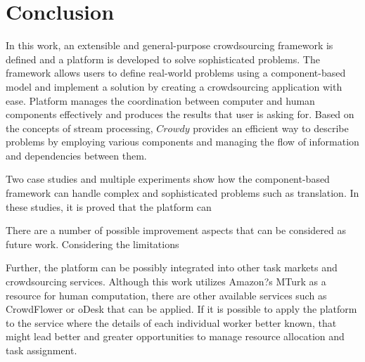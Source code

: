 \chapter{Conclusion}
\label{chap:conclusion}

In this work, an extensible and general-purpose crowdsourcing framework is defined and a platform is developed to solve sophisticated problems. The framework allows users to define real-world problems using a component-based model and implement a solution by creating a crowdsourcing application with ease. Platform manages the coordination between computer and human components effectively and produces the results that user is asking for. Based on the concepts of stream processing, $Crowdy$ provides an efficient way to describe problems by employing various components and managing the flow of information and dependencies between them.

Two case studies and multiple experiments show how the component-based framework can handle complex and sophisticated problems such as translation. In these studies, it is proved that the platform can 


There are a number of possible improvement aspects that can be considered as future work. Considering the limitations 

Further, the platform can be possibly integrated into other task markets and crowdsourcing services. Although this work utilizes Amazon?s MTurk as a resource for human computation, there are other available services such as CrowdFlower or oDesk that can be applied. If it is possible to apply the platform to the service where the details of each individual worker better known, that might lead better and greater opportunities to manage resource allocation and task assignment.

